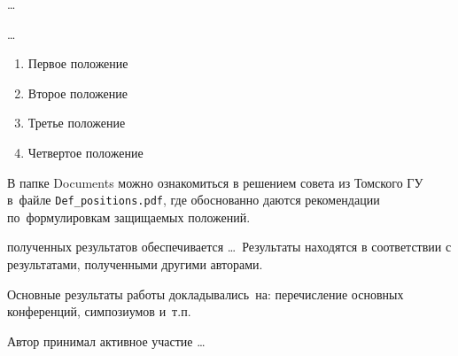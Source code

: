 {\influence} \ldots

{\methods} \ldots

{}
\begin{enumerate}
  \item Первое положение
  \item Второе положение
  \item Третье положение
  \item Четвертое положение
\end{enumerate}
В папке Documents можно ознакомиться в решением совета из Томского ГУ
в~файле \verb+Def_positions.pdf+, где обоснованно даются рекомендации
по~формулировкам защищаемых положений.

{\reliability} полученных результатов обеспечивается \ldots \ Результаты находятся в соответствии с результатами, полученными другими авторами.


{\probation}
Основные результаты работы докладывались~на:
перечисление основных конференций, симпозиумов и~т.\:п.

{\contribution} Автор принимал активное участие \ldots

